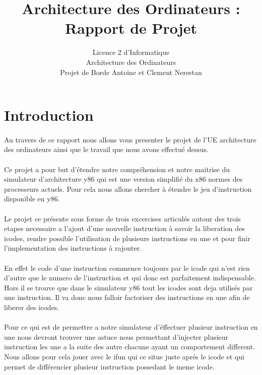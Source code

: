 \documentclass[12pt]{article}
\title{Architecture des Ordinateurs : Rapport de Projet}
\author{Licence 2 d'Informatique\\ 
  Architecture des Ordinateurs\\
  Projet de Borde Antoine et Clement Nerestan}
\begin{document}
\maketitle

\newpage

\tableofcontents

\newpage

\section*{Introduction}

\paragraph{} Au travers de ce rapport nous allons vous presenter le projet
 de l'UE architecture des ordinateurs ainsi que le travail que nous avons 
 effectué dessus.

\paragraph{} Ce projet a pour but d'étendre notre compréhension et notre 
maitrise du simulateur d'architecture y86 qui est une version simplifié
du x86 normes des processeurs actuels. Pour cela nous allons chercher à 
étendre le jeu d'instruction disponible en y86.

\paragraph{} Le projet ce présente sous forme de trois excercises
articulés autour des trois etapes
necessaire a l'ajout d'une nouvelle instruction à savoir la liberation
des icodes, rendre possible l'utilisation de plusieurs instructions en
une et pour finir l'implementation des instructions à rajouter.

\paragraph{} En effet le code d'une instruction commence toujours par le
 icode qui n'est rien d'autre que le numero de l'instruction et qui
 donc est parfaitement indispensable. Hors il se trouve que dans le simulateur
 y86 tout les icodes sont deja utilisés par une instruction. Il va donc nous
 falloir factoriser des instructions en une afin de liberer des icodes.

\paragraph{} Pour ce qui est de permettre a notre simulateur d'éffectuer
plusieur instruction en une nous devront trouver une astuce nous permettant
d'injecter plusieur instruction les une a la suite des autre chacune ayant un
comportement different. Nous allons pour cela jouer avec le ifun qui ce situe
juste aprés le icode et qui permet de différencier plusieur instruction possedant le meme icode.
\end{document}
